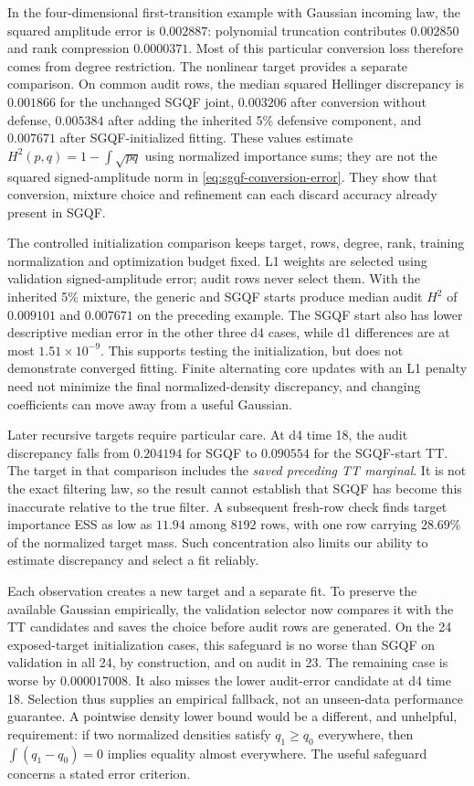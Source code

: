 \documentclass[11pt]{article}
\begin{document}
In the four-dimensional first-transition example with Gaussian incoming law,
the squared amplitude error is $0.002887$: polynomial truncation contributes
$0.002850$ and rank compression $0.0000371$. Most of this particular
conversion loss therefore comes from degree restriction. The nonlinear target
provides a separate comparison. On common audit rows, the median squared
Hellinger discrepancy is $0.001866$ for the unchanged SGQF joint,
$0.003206$ after conversion without defense, $0.005384$ after adding the
inherited 5\% defensive component, and $0.007671$ after SGQF-initialized
fitting. These values estimate $H^2(p,q)=1-\int\sqrt{pq}$ using normalized
importance sums; they are not the squared signed-amplitude norm in
\eqref{eq:sgqf-conversion-error}. They show that conversion, mixture choice
and refinement can each discard accuracy already present in SGQF.

The controlled initialization comparison keeps target, rows, degree, rank,
training normalization and optimization budget fixed. L1 weights are selected
using validation signed-amplitude error; audit rows never select them. With
the inherited 5\% mixture, the generic and SGQF starts produce median audit
$H^2$ of $0.009101$ and $0.007671$ on the preceding example. The SGQF start
also has lower descriptive median error in the other three d4 cases, while
d1 differences are at most $1.51\times10^{-9}$. This supports testing the
initialization, but does not demonstrate converged fitting. Finite alternating
core updates with an L1 penalty need not minimize the final normalized-density
discrepancy, and changing coefficients can move away from a useful Gaussian.

Later recursive targets require particular care. At d4 time 18, the audit
discrepancy falls from $0.204194$ for SGQF to $0.090554$ for the SGQF-start
TT. The target in that comparison includes the \emph{saved preceding TT
marginal}. It is not the exact filtering law, so the result cannot establish
that SGQF has become this inaccurate relative to the true filter. A subsequent
fresh-row check finds target importance ESS as low as $11.94$ among $8192$
rows, with one row carrying $28.69\%$ of the normalized target mass. Such
concentration also limits our ability to estimate discrepancy and select a
fit reliably.

Each observation creates a new target and a separate fit. To preserve the
available Gaussian empirically, the validation selector now compares it with
the TT candidates and saves the choice before audit rows are generated. On
the 24 exposed-target initialization cases, this safeguard is no worse than
SGQF on validation in all 24, by construction, and on audit in 23. The remaining
case is worse by $0.000017008$. It also misses the lower audit-error candidate
at d4 time 18. Selection thus supplies an empirical fallback, not an unseen-data
performance guarantee. A pointwise density lower bound would be a different,
and unhelpful, requirement: if two normalized densities satisfy
$q_1\geq q_0$ everywhere, then $\int(q_1-q_0)=0$ implies equality almost
everywhere. The useful safeguard concerns a stated error criterion.
\end{document}
